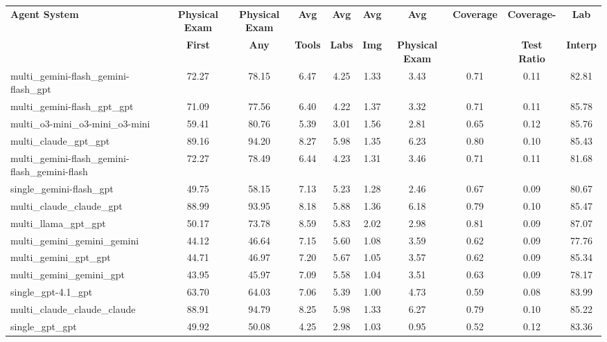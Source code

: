 \documentclass[manuscript, nonacm]{acmart}
\begin{document}
\begin{table}[h!]
\centering
\scriptsize
\begin{tabular}{|l|c|c|c|c|c|c|c|c|c|}
\hline
\textbf{Agent System} & \textbf{Physical Exam} & \textbf{Physical Exam} & \textbf{Avg} & \textbf{Avg} & \textbf{Avg} & \textbf{Avg} & \textbf{Coverage} & \textbf{Coverage-} & \textbf{Lab} \\
 & \textbf{First} & \textbf{Any} & \textbf{Tools} & \textbf{Labs} & \textbf{Img} & \textbf{Physical Exam} & \textbf{} & \textbf{Test Ratio} & \textbf{Interp} \\
\hline
multi\_gemini-flash\_gemini-flash\_gpt & 72.27 & 78.15 & 6.47 & 4.25 & 1.33 & 3.43 & 0.71 & 0.11 & 82.81 \\
\hline
multi\_gemini-flash\_gpt\_gpt & 71.09 & 77.56 & 6.40 & 4.22 & 1.37 & 3.32 & 0.71 & 0.11 & 85.78 \\
\hline
multi\_o3-mini\_o3-mini\_o3-mini & 59.41 & 80.76 & 5.39 & 3.01 & 1.56 & 2.81 & 0.65 & 0.12 & 85.76 \\
\hline
multi\_claude\_gpt\_gpt & 89.16 & 94.20 & 8.27 & 5.98 & 1.35 & 6.23 & 0.80 & 0.10 & 85.43 \\
\hline
multi\_gemini-flash\_gemini-flash\_gemini-flash & 72.27 & 78.49 & 6.44 & 4.23 & 1.31 & 3.46 & 0.71 & 0.11 & 81.68 \\
\hline
single\_gemini-flash\_gpt & 49.75 & 58.15 & 7.13 & 5.23 & 1.28 & 2.46 & 0.67 & 0.09 & 80.67 \\
\hline
multi\_claude\_claude\_gpt & 88.99 & 93.95 & 8.18 & 5.88 & 1.36 & 6.18 & 0.79 & 0.10 & 85.47 \\
\hline
multi\_llama\_gpt\_gpt & 50.17 & 73.78 & 8.59 & 5.83 & 2.02 & 2.98 & 0.81 & 0.09 & 87.07 \\
\hline
multi\_gemini\_gemini\_gemini & 44.12 & 46.64 & 7.15 & 5.60 & 1.08 & 3.59 & 0.62 & 0.09 & 77.76 \\
\hline
multi\_gemini\_gpt\_gpt & 44.71 & 46.97 & 7.20 & 5.67 & 1.05 & 3.57 & 0.62 & 0.09 & 85.34 \\
\hline
multi\_gemini\_gemini\_gpt & 43.95 & 45.97 & 7.09 & 5.58 & 1.04 & 3.51 & 0.63 & 0.09 & 78.17 \\
\hline
single\_gpt-4.1\_gpt & 63.70 & 64.03 & 7.06 & 5.39 & 1.00 & 4.73 & 0.59 & 0.08 & 83.99 \\
\hline
multi\_claude\_claude\_claude & 88.91 & 94.79 & 8.25 & 5.98 & 1.33 & 6.27 & 0.79 & 0.10 & 85.22 \\
\hline
single\_gpt\_gpt & 49.92 & 50.08 & 4.25 & 2.98 & 1.03 & 0.95 & 0.52 & 0.12 & 83.36 \\

\end{tabular}
\end{table}
\end{document}
